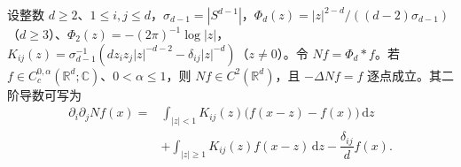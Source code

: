 \begin{theorem}\label{b2:thm:13-newton-holder}
设整数 \(d\geq2\)、\(1\leq i,j\leq d\)，\(\sigma_{d-1}=|S^{d-1}|\)，\(\Phi_d(z)=|z|^{2-d}/((d-2)\sigma_{d-1})\)（\(d\geq3\)）、\(\Phi_2(z)=-(2\pi)^{-1}\log|z|\)，\(K_{ij}(z)=\sigma_{d-1}^{-1}(dz_iz_j|z|^{-d-2}-\delta_{ij}|z|^{-d})\)（\(z\ne0\)）。令 \(Nf=\Phi_d*f\)。若 \(f\in C_c^{0,\alpha}(\mathbb R^d;\mathbb C)\)、\(0<\alpha\leq1\)，则 \(Nf\in C^2(\mathbb R^d)\)，且 \(-\Delta Nf=f\) 逐点成立。其二阶导数可写为
\begin{equation}\label{b2:eq:13-newton-hessian}
 \begin{aligned}
 \partial_i\partial_jNf(x)={}&
 \int_{|z|<1}K_{ij}(z)\bigl(f(x-z)-f(x)\bigr)\,\mathrm{d}z\\
 &+\int_{|z|\geq1}K_{ij}(z)f(x-z)\,\mathrm{d}z
 -\dfrac{\delta_{ij}}d f(x).
 \end{aligned}
\end{equation}
\end{theorem}
